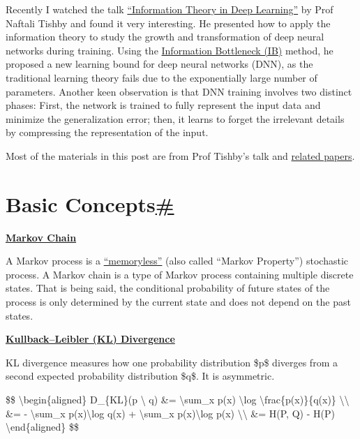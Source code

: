Recently I watched the talk \href{https://youtu.be/bLqJHjXihK8}{``Information Theory in Deep Learning''} by Prof Naftali Tishby and found it very interesting. He presented how to apply the information theory to study the growth and transformation of deep neural networks during training. Using the \href{https://arxiv.org/pdf/physics/0004057.pdf}{Information Bottleneck (IB)} method, he proposed a new learning bound for deep neural networks (DNN), as the traditional learning theory fails due to the exponentially large number of parameters. Another keen observation is that DNN training involves two distinct phases: First, the network is trained to fully represent the input data and minimize the generalization error; then, it learns to forget the irrelevant details by compressing the representation of the input.

Most of the materials in this post are from Prof Tishby's talk and \href{https://lilianweng.github.io/posts/2017-09-28-information-bottleneck/\#references}{related papers}.

\section{\texorpdfstring{Basic Concepts\hyperref[basic-concepts]{\#}}{Basic Concepts\#}}\label{basic-concepts}

\href{https://en.wikipedia.org/wiki/Markov_chain}{\textbf{Markov Chain}}

A Markov process is a \href{http://mathworld.wolfram.com/Memoryless.html}{``memoryless''} (also called ``Markov Property'') stochastic process. A Markov chain is a type of Markov process containing multiple discrete states. That is being said, the conditional probability of future states of the process is only determined by the current state and does not depend on the past states.

\href{https://en.wikipedia.org/wiki/Kullback\%E2\%80\%93Leibler_divergence}{\textbf{Kullback--Leibler (KL) Divergence}}

KL divergence measures how one probability distribution \$p\$ diverges from a second expected probability distribution \$q\$. It is asymmetric.

\$\$ \textbackslash begin\{aligned\} D\_\{KL\}(p \textbackslash\textbar{} q) \&= \textbackslash sum\_x p(x) \textbackslash log \textbackslash frac\{p(x)\}\{q(x)\} \textbackslash\textbackslash{} \&= - \textbackslash sum\_x p(x)\textbackslash log q(x) + \textbackslash sum\_x p(x)\textbackslash log p(x) \textbackslash\textbackslash{} \&= H(P, Q) - H(P) \textbackslash end\{aligned\} \$\$

